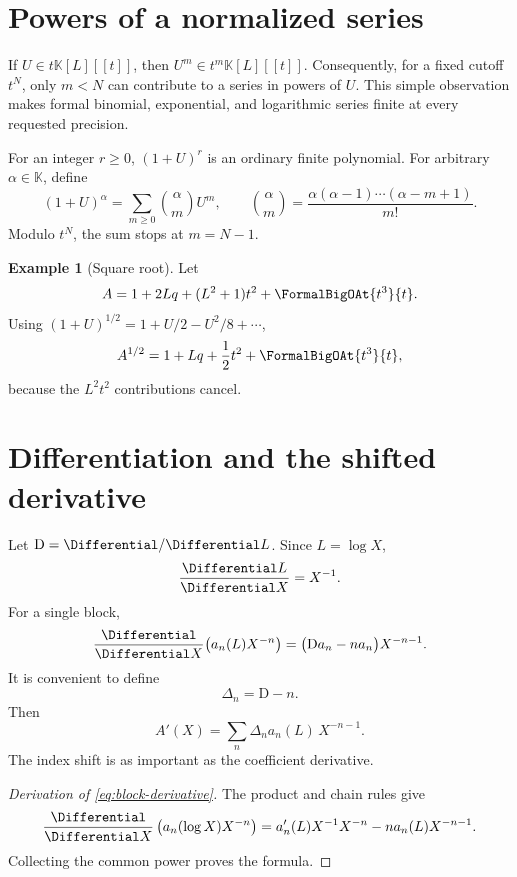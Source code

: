 \documentclass[11pt,openany]{book}
\theoremstyle{definition}
\newtheorem{example}{Example}[chapter]
\theoremstyle{plain}
\theoremstyle{remark}
\newcommand{\K}{\mathbb{K}}
\newcommand{\Dop}{\mathrm{D}}
\begin{document}
\section{Powers of a normalized series}
If \(U\in t\K[L][[t]]\), then \(U^m\in t^m\K[L][[t]]\).  Consequently, for a
fixed cutoff \(t^N\), only \(m<N\) can contribute to a series in powers of
\(U\).  This simple observation makes formal binomial, exponential, and
logarithmic series finite at every requested precision.

For an integer \(r\ge0\), \((1+U)^r\) is an ordinary finite polynomial.  For
arbitrary \(\alpha\in\K\), define
\begin{equation}\label{eq:formal-binomial}
 (1+U)^\alpha
 =\sum_{m\ge0}\binom{\alpha}{m}U^m,
 \qquad
 \binom{\alpha}{m}=
 \frac{\alpha(\alpha-1)\cdots(\alpha-m+1)}{m!}.
\end{equation}
Modulo \(t^N\), the sum stops at \(m=N-1\).

\begin{example}[Square root]
Let
\[
 A=1+2Lq+(L^2+1)t^2+\FormalBigOAt{t^3}{t}.
\]
Using \((1+U)^{1/2}=1+U/2-U^2/8+\cdots\),
\[
 A^{1/2}=1+Lq+\frac12t^2+\FormalBigOAt{t^3}{t},
\]
because the \(L^2t^2\) contributions cancel.
\end{example}

\section{Differentiation and the shifted derivative}
Let \(\Dop=\Differential/\Differential L\).  Since \(L=\log X\),
\[
 \frac{\Differential L}{\Differential X}=X^{-1}.
\]
For a single block,
\begin{equation}\label{eq:block-derivative}
 \frac{\Differential}{\Differential X}\bigl(a_n(L)X^{-n}\bigr)
 =\bigl(\Dop a_n-na_n\bigr)X^{-n-1}.
\end{equation}
It is convenient to define
\begin{equation}\label{eq:Delta-n}
 \Delta_n=\Dop-n.
\end{equation}
Then
\begin{equation}\label{eq:derivative-series}
 A'(X)=\sum_n \Delta_n a_n(L)\,X^{-n-1}.
\end{equation}
The index shift is as important as the coefficient derivative.

\begin{proof}[Derivation of \cref{eq:block-derivative}]
The product and chain rules give
\[
 \frac{\Differential}{\Differential X}\left(a_n(\log X)X^{-n}\right)
 =a_n'(L)X^{-1}X^{-n}-na_n(L)X^{-n-1}.
\]
Collecting the common power proves the formula.
\end{proof}
\end{document}
